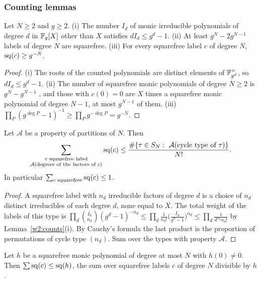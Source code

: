 \subsubsection{Counting lemmas}

\begin{lemma}\label{w2:counts}
Let $N\ge2$ and $g\ge2$. (i) The number $I_d$ of monic irreducible polynomials of degree $d$ in $\mathbb F_g[X]$ other than $X$ satisfies $dI_d\le g^d-1$. (ii) At least $g^N-2g^{N-1}$ labels of degree $N$ are squarefree. (iii) For every squarefree label $c$ of degree $N$, $\mathrm{sq}(c)\ge g^{-N}$.
\end{lemma}

\begin{proof}
(i) The roots of the counted polynomials are distinct elements of $\mathbb F_{g^d}^\times$, so $dI_d\le g^d-1$. (ii) The number of squarefree monic polynomials of degree $N\ge2$ is $g^N-g^{N-1}$ \cite[Prop.~2.3]{w2rosen}, and those with $c(0)=0$ are $X$ times a squarefree monic polynomial of degree $N-1$, at most $g^{N-1}$ of them. (iii) $\prod_P(g^{\deg P}-1)^{-1}\ge\prod_Pg^{-\deg P}=g^{-N}$.
\end{proof}

\begin{lemma}\label{w2:types}
Let $\mathcal A$ be a property of partitions of $N$. Then
\[
\sum_{\substack{c\text{ squarefree label}\\ \mathcal A(\text{degrees of the factors of }c)}}\mathrm{sq}(c)\le\frac{\#\{\tau\in S_N:\ \mathcal A(\text{cycle type of }\tau)\}}{N!}.
\]
In particular $\sum_{c\text{ squarefree}}\mathrm{sq}(c)\le1$.
\end{lemma}

\begin{proof}
A squarefree label with $n_d$ irreducible factors of degree $d$ is a choice of $n_d$ distinct irreducibles of each degree $d$, none equal to $X$. The total weight of the labels of this type is $\prod_d\binom{I_d}{n_d}(g^d-1)^{-n_d}\le\prod_d\frac{1}{n_d!}\bigl(\frac{I_d}{g^d-1}\bigr)^{n_d}\le\prod_d\frac{1}{d^{n_d}n_d!}$ by Lemma~\ref{w2:counts}(i). By Cauchy's formula the last product is the proportion of permutations of cycle type $(n_d)$. Sum over the types with property $\mathcal A$.
\end{proof}

\begin{lemma}[multiples]\label{w2:mult}
Let $h$ be a squarefree monic polynomial of degree at most $N$ with $h(0)\ne0$. Then $\sum\mathrm{sq}(c)\le\mathrm{sq}(h)$, the sum over squarefree labels $c$ of degree $N$ divisible by $h$.
\end{lemma}

